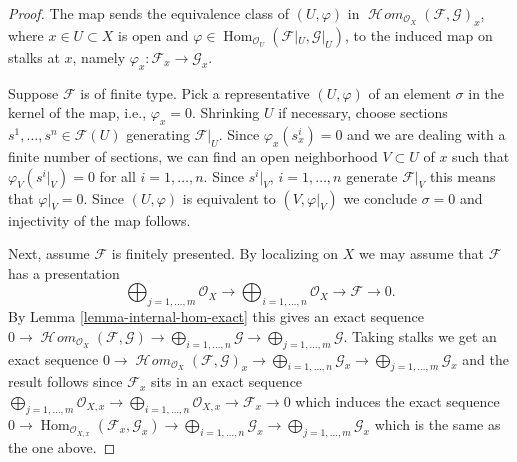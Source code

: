 \documentclass[10pt,a4paper]{amsart}
\theoremstyle{plain}
\theoremstyle{definition}
\theoremstyle{remark}
\numberwithin{equation}{subsection}
\def\Hom{\mathop{\mathrm{Hom}}\nolimits}
\def\SheafHom{\mathop{\mathcal{H}\!\mathit{om}}\nolimits}
\begin{document}
\begin{proof}
The map sends the equivalence class of
$(U, \varphi)$ in $\SheafHom_{\mathcal{O}_X}(\mathcal{F}, \mathcal{G})_x$,
where $x \in U \subset X$ is open and
$\varphi \in \Hom_{\mathcal{O}_U}(\mathcal{F}|_U, \mathcal{G}|_U)$,
to the induced map on stalks at $x$, namely
$\varphi_x : \mathcal{F}_x \to \mathcal{G}_x$.

\medskip\noindent
Suppose $\mathcal{F}$ is of finite type.
Pick a representative $(U, \varphi)$ of an element $\sigma$
in the kernel of the map, i.e., $\varphi_x = 0$.
Shrinking $U$ if necessary, choose sections
$s^1, \ldots, s^n \in \mathcal{F}(U)$ generating $\mathcal{F}|_U$.
Since $\varphi_x(s^i_x) = 0$
and we are dealing with a finite number of sections,
we can find an open neighborhood 
$V \subset U$ of $x$ such that $\varphi_V(s^i|_V)=0$
for all $i = 1, \ldots, n$. Since $s^i|_V$, $i = 1, \ldots, n$ generate
$\mathcal{F}|_V$ this means that $\varphi|_V = 0$.
Since $(U, \varphi)$ is equivalent to $(V, \varphi|_V)$
we conclude $\sigma = 0$ and injectivity of the map follows.

\medskip\noindent
Next, assume $\mathcal{F}$ is finitely presented.
By localizing on $X$ we may assume that $\mathcal{F}$ has a presentation
$$
\bigoplus\nolimits_{j = 1, \ldots, m}
\mathcal{O}_X
\longrightarrow
\bigoplus\nolimits_{i = 1, \ldots, n}
\mathcal{O}_X
\to
\mathcal{F}
\to
0.
$$
By Lemma \ref{lemma-internal-hom-exact} this gives an exact sequence
$
0 \to
\SheafHom_{\mathcal{O}_X}(\mathcal{F}, \mathcal{G}) \to
\bigoplus\nolimits_{i = 1, \ldots, n} \mathcal{G}
\longrightarrow
\bigoplus\nolimits_{j = 1, \ldots, m} \mathcal{G}.
$
Taking stalks we get an exact sequence
$
0 \to
\SheafHom_{\mathcal{O}_X}(\mathcal{F}, \mathcal{G})_x \to
\bigoplus\nolimits_{i = 1, \ldots, n} \mathcal{G}_x
\longrightarrow
\bigoplus\nolimits_{j = 1, \ldots, m} \mathcal{G}_x
$
and the result follows since $\mathcal{F}_x$ sits in
an exact sequence
$
\bigoplus\nolimits_{j = 1, \ldots, m}
\mathcal{O}_{X, x}
\longrightarrow
\bigoplus\nolimits_{i = 1, \ldots, n}
\mathcal{O}_{X, x}
\to
\mathcal{F}_x
\to
0
$
which induces the exact sequence
$
0 \to
\Hom_{\mathcal{O}_{X, x}}(\mathcal{F}_x, \mathcal{G}_x) \to
\bigoplus\nolimits_{i = 1, \ldots, n} \mathcal{G}_x
\longrightarrow
\bigoplus\nolimits_{j = 1, \ldots, m} \mathcal{G}_x
$
which is the same as the one above.
\end{proof}
\end{document}
